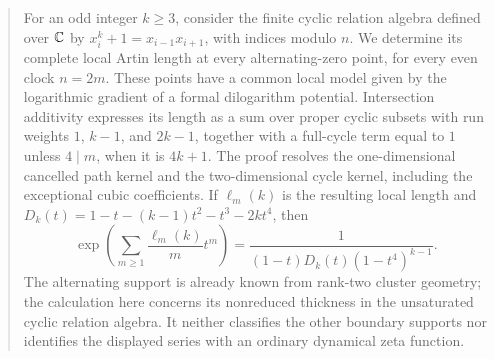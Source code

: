 \begin{abstract}
For an odd integer $k\geq3$, consider the finite cyclic relation algebra
defined over $\C$ by $x_i^k+1=x_{i-1}x_{i+1}$, with indices modulo $n$.
We determine its complete local Artin length at every alternating-zero
point, for every even clock $n=2m$. These points have a common local model
given by the logarithmic gradient of a formal dilogarithm potential.
Intersection additivity expresses its length as a sum over proper cyclic
subsets with run weights $1$, $k-1$, and $2k-1$, together with a full-cycle
term equal to $1$ unless $4\mid m$, when it is $4k+1$.
The proof resolves the one-dimensional cancelled path kernel and the
two-dimensional cycle kernel, including the exceptional cubic coefficients.
If $\ell_m(k)$ is the resulting local length and
$D_k(t)=1-t-(k-1)t^2-t^3-2kt^4$, then
\[
 \exp\!\left(\sum_{m\geq1}\frac{\ell_m(k)}m t^m\right)
 =\frac1{(1-t)D_k(t)(1-t^4)^{k-1}}.
\]
The alternating support is already known from rank-two cluster geometry;
the calculation here concerns its nonreduced thickness in the unsaturated
cyclic relation algebra. It neither classifies the other boundary supports
nor identifies the displayed series with an ordinary dynamical zeta function.
\end{abstract}
